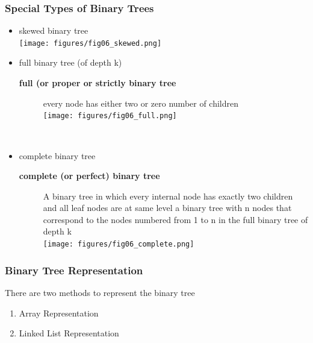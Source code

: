 \documentclass[newPxFont,sthlmFooter,nooffset]{beamer}
\begin{document}
\begin{frame}[t, allowframebreaks]
  \frametitle{Special Types of Binary Trees}
  \begin{itemize}
  \item skewed binary tree \\
     \texttt{[image: figures/fig06\_skewed.png]}
\newpage
~\bigskip
  \item full binary tree (of depth k) 
    \begin{description}
    \item[\textbf{full (or proper or strictly binary tree}] every node has either two or zero number of children \\
 
        \texttt{[image: figures/fig06\_full.png]}
 
\newpage
~\bigskip
    \end{description}
  \item complete binary tree 
    \begin{description}
    \item[\textbf{complete (or perfect) binary tree}] A binary tree in which every internal node has exactly two children and all leaf nodes are at same level
a binary tree with n nodes that
      correspond to the nodes numbered from 1 to n in the full binary
      tree of depth k\\
        \texttt{[image: figures/fig06\_complete.png]}


    \end{description}

  \end{itemize}

\end{frame}


\begin{frame}[t]
  \frametitle{Binary Tree Representation}
There are two methods to represent the binary tree
\begin{enumerate}
\item Array Representation
\item Linked List Representation
\end{enumerate}
\end{frame}
\end{document}
